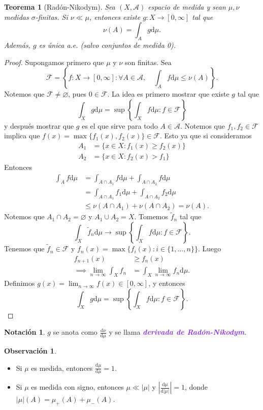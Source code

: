 \documentclass{article}
\newtheorem{theorem}{Teorema}[subsection]
\theoremstyle{definition}
\newtheorem*{notation}{Notación}
\newtheorem*{obs}{Observación}
\theoremstyle{remark}
\numberwithin{equation}{section}
\newcommand{\Acal}{\mathcal{A}}
\newcommand{\Fcal}{\mathcal{F}}
\renewcommand{\d}{\mathrm{d}}
\newcommand{\oo}{\infty}
\renewcommand{\tilde}{\widetilde}
\newcommand{\abs}[1]{\left| #1 \right|}
\newcommand{\set}[1]{\left\{ #1 \right\}}
\newcommand{\ds}{\displaystyle}
\newcommand{\wea}[1]{\textcolor{BlueViolet}{\textbf{\emph{#1}}}}
\begin{document}
\begin{theorem}
  [Radón-Nikodym]
  Sea $(X,\Acal)$ espacio de medida y sean $\mu,\nu$ medidas $\sigma$-finitas. Si $\nu \ll \mu$, entonces existe $g \colon X \to [0,\oo]$ tal que 
  \[ \nu(A) = \int_A g \d\mu. \]
  Además, $g$ es única a.e. (salvo conjuntos de medida 0).
\end{theorem}
\begin{proof}
  Supongamos primero que $\mu$ y $\nu$ son finitas. Sea
  \[ \Fcal = \set{f \colon X \to [0,\oo] : \forall A \in \Acal, \quad \int_A f\d\mu \leq \nu(A)}. \]
  Notemos que $\Fcal \neq \varnothing$, pues $0 \in \Fcal$.
  La idea es primero mostrar que existe $g$ tal que
  \[ \int_X g \d\mu = \sup \set{\int_X f\d\mu : f \in \Fcal} \]
  y después mostrar que $g$ es el que sirve para todo $A \in \Acal$.
  Notemos que $f_1, f_2 \in \Fcal$ implica que $f(x) = \max\{f_1(x),f_2(x)\} \in \Fcal$. Esto ya que si consideramos
  \begin{align*}
      A_1 &= \{x \in X : f_1(x) \geq f_2(x)\} \\
      A_2 &= \{x \in X : f_2(x) > f_1\}
  \end{align*}
  Entonces
  \begin{align*}
      \int_A f\d\mu
      &= \int_{A \cap A_1} f \d\mu + \int_{A \cap A_2} f \d\mu \\
      &= \int_{A \cap A_1} f_1 \d\mu + \int_{A \cap A_2} f_2 \d\mu \\
      &\leq \nu(A \cap A_1) + \nu(A \cap A_2) = \nu(A).
  \end{align*}
  Notemos que $A_1 \cap A_2 = \varnothing$ y $A_1 \cup A_2 = X$. Tomemos $\tilde f_n$ tal que
  \[ \int_X \tilde f_n \d\mu \to \sup\set{\int_X f\d\mu : f \in \Fcal}. \]
  Tenemos que $\tilde f_n \in \Fcal$ y $f_n (x) = \max\{f_i(x) : i \in \{1,\dots,n\}\}$. Luego
  \begin{align*}
      f_{n+1}(x) &\geq f_n(x) \\
      \implies \lim_{n\to\oo} \int_X f_n &= \int_X \lim_{n\to\oo} f_n \d\mu.
  \end{align*}
  Definimos $g(x) = \lim_{n\to\oo} f(x) \in [0,\oo]$, y entonces 
  \[ \int_X g\d\mu = \sup\set{\int_X f\d\mu : f \in \Fcal}. \]
\end{proof}

\begin{notation}
  $g$ se anota como $\ds \frac{\d\nu}{\d\mu}$ y se llama \wea{derivada de Radón-Nikodym}.
\end{notation}

\begin{obs}
  \ \begin{itemize}
    \item Si $\mu$ es medida, entonces $\ds \frac{\d\mu}{\d\mu} = 1$.
    \item Si $\mu$ es medida con signo, entonces $\mu \ll \abs \mu$ y $\ds \abs{\frac{\d\mu}{\d\abs\mu}} = 1$, donde $\abs\mu(A) = \mu_+(A) + \mu_-(A)$.
  \end{itemize}
\end{obs}
\end{document}
